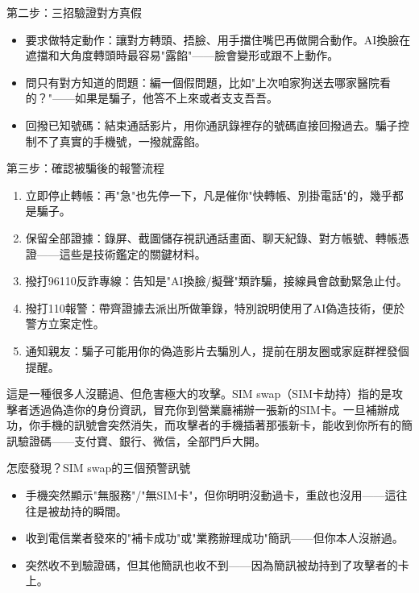 \begin{tcbinfo}{第二步：三招驗證對方真假}
\begin{itemize}
  \item 要求做特定動作：讓對方轉頭、捂臉、用手擋住嘴巴再做開合動作。AI換臉在遮擋和大角度轉頭時最容易"露餡"——臉會變形或跟不上動作。
  \item 問只有對方知道的問題：編一個假問題，比如"上次咱家狗送去哪家醫院看的？"——如果是騙子，他答不上來或者支支吾吾。
  \item 回撥已知號碼：結束通話影片，用你通訊錄裡存的號碼直接回撥過去。騙子控制不了真實的手機號，一撥就露餡。
\end{itemize}

\end{tcbinfo}

\begin{tcbwarn}{第三步：確認被騙後的報警流程}
\begin{enumerate}
  \item 立即停止轉帳：再"急"也先停一下，凡是催你"快轉帳、別掛電話"的，幾乎都是騙子。
  \item 保留全部證據：錄屏、截圖儲存視訊通話畫面、聊天紀錄、對方帳號、轉帳憑證——這些是技術鑑定的關鍵材料。
  \item 撥打96110反詐專線：告知是"AI換臉/擬聲"類詐騙，接線員會啟動緊急止付。
  \item 撥打110報警：帶齊證據去派出所做筆錄，特別說明使用了AI偽造技術，便於警方立案定性。
  \item 通知親友：騙子可能用你的偽造影片去騙別人，提前在朋友圈或家庭群裡發個提醒。
\end{enumerate}

\end{tcbwarn}


這是一種很多人沒聽過、但危害極大的攻擊。SIM swap（SIM卡劫持）指的是攻擊者透過偽造你的身份資訊，冒充你到營業廳補辦一張新的SIM卡。一旦補辦成功，你手機的訊號會突然消失，而攻擊者的手機插著那張新卡，能收到你所有的簡訊驗證碼——支付寶、銀行、微信，全部門戶大開。

\begin{tcbinfo}{怎麼發現？SIM swap的三個預警訊號}
\begin{itemize}
  \item 手機突然顯示"無服務"/"無SIM卡"，但你明明沒動過卡，重啟也沒用——這往往是被劫持的瞬間。
  \item 收到電信業者發來的"補卡成功"或"業務辦理成功"簡訊——但你本人沒辦過。
  \item 突然收不到驗證碼，但其他簡訊也收不到——因為簡訊被劫持到了攻擊者的卡上。
\end{itemize}

\end{tcbinfo}


